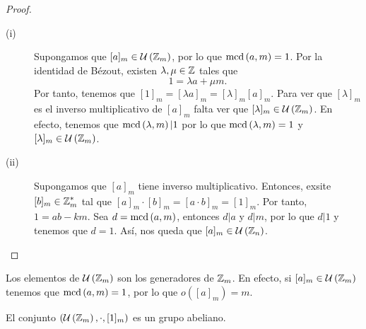 \begin{proof}
\begin{description}
	\item[(i)] Supongamos que $\displaystyle [a]_{m} \in \mathcal{U}\left(\mathbb{Z}_{m}\right) $, por lo que $\displaystyle \text{mcd}\left(a,m\right) = 1 $. Por la identidad de Bézout, existen $\displaystyle \lambda, \mu \in \mathbb{Z} $ tales que 
		\[1 = \lambda a + \mu m .\]
		Por tanto, tenemos que $\displaystyle [1]_{m} = [\lambda a]_{m} = [\lambda]_{m}[a]_{m} $. Para ver que $\displaystyle [\lambda]_{m} $ es el inverso multiplicativo de $\displaystyle [a]_{m} $ falta ver que $\displaystyle [\lambda]_{m} \in \mathcal{U}\left(\mathbb{Z}_{m}\right) $. En efecto, tenemos que $\displaystyle \text{mcd}\left(\lambda, m\right) | 1 $ por lo que $\displaystyle \text{mcd}\left(\lambda, m\right) = 1 $ y $\displaystyle [\lambda]_{m} \in \mathcal{U}\left(\mathbb{Z}_{m}\right) $. 
	\item[(ii)] Supongamos que $\displaystyle [a]_{m} $ tiene inverso multiplicativo. Entonces, exsite $\displaystyle [b]_{m} \in \mathbb{Z}_{m}^{*} $ tal que $\displaystyle [a]_{m} \cdot [b]_{m} = [a \cdot b]_{m} = [1]_{m} $. Por tanto, $\displaystyle 1 = ab - km $. Sea $\displaystyle d = \text{mcd}\left(a,m\right) $, entonces $\displaystyle d | a $ y $\displaystyle d | m $, por lo que $\displaystyle d | 1 $ y tenemos que $\displaystyle d = 1 $. Así, nos queda que $\displaystyle [a]_{m} \in \mathcal{U}\left(\mathbb{Z}_{n}\right) $.
\end{description}
\end{proof}
\begin{observation}
	Los elementos de $\displaystyle \mathcal{U}\left(\mathbb{Z}_{m}\right) $ son los generadores de $\displaystyle \mathbb{Z}_{m} $. En efecto, si $\displaystyle [a]_{m} \in \mathcal{U}\left(\mathbb{Z}_{m}\right) $ tenemos que $\displaystyle \text{mcd}\left(a,m\right) = 1 $, por lo que $\displaystyle o\left([a]_{m}\right) = m $.
\end{observation}
\begin{prop}
El conjunto $\displaystyle \left(\mathcal{U}\left(\mathbb{Z}_{m}\right), \cdot , [1]_{m}\right) $ es un grupo abeliano.
\end{prop}
